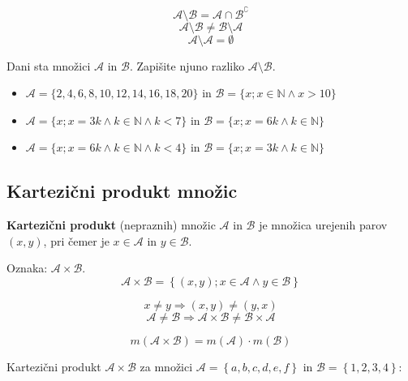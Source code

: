     

                $$ \mathcal{A}\setminus\mathcal{B}=\mathcal{A}\cap\mathcal{B}^\complement$$
                $$ \mathcal{A}\setminus\mathcal{B}\neq\mathcal{B}\setminus\mathcal{A}$$
                $$ \mathcal{A}\setminus\mathcal{A}=\emptyset$$


                \begin{naloga}
                    Dani sta množici $\mathcal{A}$ in $\mathcal{B}$. Zapišite njuno razliko $\mathcal{A}\setminus\mathcal{B}$.
                    \begin{itemize}
                        \item $\mathcal{A}=\{2,4,6,8,10,12,14,16,18,20\}$ in $\mathcal{B}=\{x; x\in\mathbb{N} \land x>10\}$
                        \item $\mathcal{A}=\{x; x=3k \land k\in\mathbb{N} \land k<7\}$ in $\mathcal{B}=\{x; x=6k \land k\in\mathbb{N}\}$
                        \item $\mathcal{A}=\{x; x=6k \land k\in\mathbb{N} \land k<4\}$ in $\mathcal{B}=\{x; x=3k \land k\in\mathbb{N}\}$
                    \end{itemize}
                \end{naloga}
    
    

            \subsection{Kartezični produkt množic}
                \textbf{Kartezični produkt} (nepraznih) množic $\mathcal{A}$ in $\mathcal{B}$ je množica 
                urejenih parov $(x,y)$, pri čemer je $x\in\mathcal{A}$ in $y\in\mathcal{B}$.

                Oznaka: $\mathbf{\mathcal{A}\times\mathcal{B}}$.
                $$ \mathcal{A}\times\mathcal{B}=\left\{(x,y); x\in\mathcal{A}\land y\in\mathcal{B}\right\} $$
            

            
                $$x\neq y \Rightarrow (x,y)\neq(y,x)$$
                $$\mathcal{A}\neq\mathcal{B}\Rightarrow \mathcal{A}\times\mathcal{B}\neq\mathcal{B}\times\mathcal{A}$$
            
        
                $$m(\mathcal{A}\times\mathcal{B})=m(\mathcal{A})\cdot m(\mathcal{B}) $$
            \newline

                  Kartezični produkt $\mathcal{A}\times\mathcal{B}$ za množici $ \mathcal{A}=\left\{a,b,c,d,e,f\right\}$ in
                  $ \mathcal{B}=\left\{1,2,3,4\right\}$:

